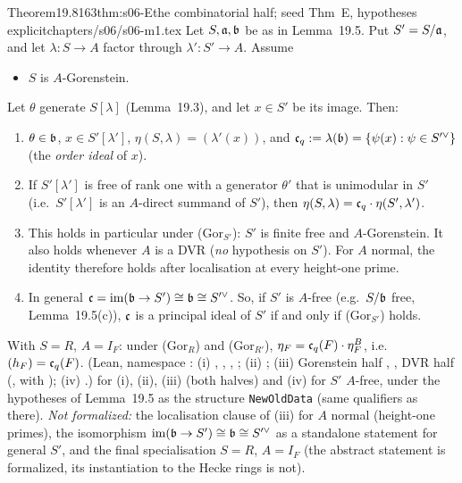 \begin{quoted}{Theorem}{19.8}{163}{thm:s06-E}{the combinatorial half; seed Thm~E, hypotheses explicit}{chapters/s06/s06-m1.tex}\label{rpt:thm:s06-E}
Let $S,\mathfrak{a},\mathfrak{b}$ be as in Lemma~19.5. Put $S'=S/\mathfrak{a}$, and let $\lambda:S\to A$ factor through $\lambda':S'\to A$. Assume
\begin{itemize}
\item[(Gor$_S$)] $S$ is $A$-Gorenstein.
\end{itemize}
Let $\theta$ generate $S[\lambda]$ (Lemma~19.3), and let $x\in S'$ be its image. Then:
\begin{enumerate}[label=(\roman*)]
\item $\theta\in\mathfrak{b}$, $x\in S'[\lambda']$, $\eta(S,\lambda)=(\lambda'(x))$, and $\mathfrak{c}_q:=\lambda(\mathfrak{b})=\{\psi(x):\psi\in S'^\vee\}$ (the
  \emph{order ideal} of $x$).
\item If $S'[\lambda']$ is free of rank one with a generator $\theta'$ that is unimodular in $S'$ (i.e.\ $S'[\lambda']$ is an
  $A$-direct summand of $S'$), then $\eta(S,\lambda)=\mathfrak{c}_q\cdot\eta(S',\lambda')$.
\item This holds in particular under (Gor$_{S'}$): $S'$ is finite free and $A$-Gorenstein. It also holds whenever $A$ is a DVR
  (\emph{no} hypothesis on $S'$). For $A$ normal, the identity therefore holds after localisation at every height-one prime.
\item In general $\mathfrak{c}=\mathrm{im}(\mathfrak{b}\to S')\cong\mathfrak{b}\cong S'^\vee$. So, if $S'$ is $A$-free (e.g.\ $S/\mathfrak{b}$ free, Lemma~19.5(c)), $\mathfrak{c}$ is a principal ideal of $S'$ if and only if
  (Gor$_{S'}$) holds.
\end{enumerate}
With $S=R$, $A=I_F$: under (Gor$_R$) and (Gor$_{R'}$), $\eta_F=\mathfrak{c}_q(F)\cdot\eta^B_F$, i.e.\ $(h_F)=\mathfrak{c}_q(F)$. \stproved{}
(Lean, namespace : (i) , , , ;
(ii) ;
(iii) Gorenstein half , , DVR half  (, with );
(iv) .)
\stformalized{} for (i), (ii), (iii) (both halves) and (iv) for $S'$ $A$-free, under the hypotheses of Lemma~19.5 as the structure \texttt{NewOldData} (same qualifiers as there). \emph{Not formalized:} the localisation clause of (iii) for $A$ normal (height-one primes), the isomorphism $\mathrm{im}(\mathfrak{b}\to S')\cong\mathfrak{b}\cong S'^\vee$ as a standalone statement for general $S'$, and the final specialisation $S=R$, $A=I_F$ (the abstract statement is formalized, its instantiation to the Hecke rings is not).
\end{quoted}
